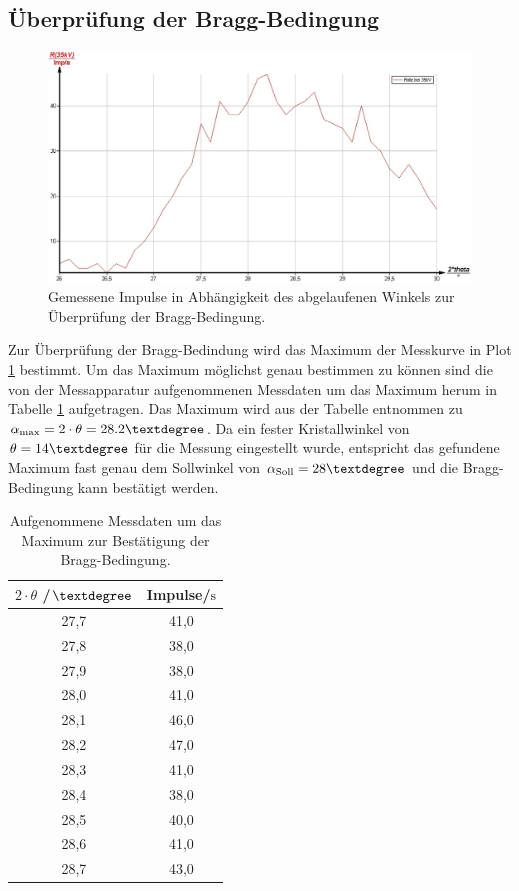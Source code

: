 \subsection{Überprüfung der Bragg-Bedingung}
\begin{figure}
	\includegraphics[width=1.0\textwidth]{nIKO_und_jULIAN_ÜLADS/breck.jpg}
	\caption{Gemessene Impulse in Abhängigkeit des abgelaufenen Winkels zur Überprüfung der Bragg-Bedingung.}
	\label{fig:braeck}
\end{figure}
Zur Überprüfung der Bragg-Bedindung wird das Maximum der Messkurve in Plot \ref{fig:braeck} bestimmt.
Um das Maximum möglichst genau bestimmen zu können sind die von der Messapparatur aufgenommenen Messdaten um das Maximum herum in Tabelle \ref{tab:bregg} aufgetragen.
Das Maximum wird aus der Tabelle entnommen zu $\alpha_\mathrm{max}=2\cdot \theta=28.2\textdegree$.
Da ein fester Kristallwinkel von $\theta=14\textdegree$ für die Messung eingestellt wurde, entspricht das gefundene Maximum fast genau dem Sollwinkel von $\alpha_\mathrm{Soll}=28\textdegree$ und die Bragg-Bedingung kann bestätigt werden.
\begin{table}
	\centering
	\caption{Aufgenommene Messdaten um das Maximum zur Bestätigung der Bragg-Bedingung.}
	\label{tab:bregg}
	\begin{tabular} {cc}
		\toprule
		$2 \cdot \theta$ /$\textdegree$ &Impulse/$\si{\second}$ \\%
\midrule
		27,7	&41,0\\
		27,8	&38,0\\
		27,9	&38,0\\
		28,0	&41,0\\
		28,1	&46,0\\
		28,2	&47,0\\
		28,3	&41,0\\
		28,4	&38,0\\
		28,5	&40,0\\
		28,6	&41,0\\
		28,7	&43,0\\
\bottomrule
	\end{tabular}
\end{table}

